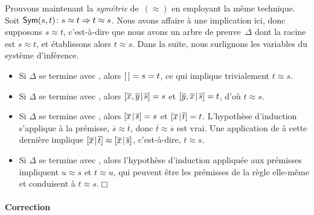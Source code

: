 Prouvons maintenant la \emph{symétrie} de~\((\approx)\) en employant
la même technique. Soit
\(\textsf{Sym}({s,t})\colon s \approx t \Rightarrow t \approx s\). Nous
avons affaire à une implication ici, donc supposons \(s \approx t\),
c'est-à-dire que nous avons un arbre de preuve~\(\Delta\) dont la
racine est \(s \approx t\), et établissons alors \(t \approx s\). Dans
la suite, nous surlignons les variables du système d'inférence.
\begin{itemize}

  \item Si \(\Delta\) se termine avec , alors \([\,] = s =
  t\), ce qui implique trivialement \(t \approx s\).

  \item Si \(\Delta\) se termine avec , alors
  \([{\overline{x},\overline{y}}\!\mid\!{\overline{s}}] = s\) et
  \([{\overline{y},\overline{x}}\!\mid\!{\overline{s}}] = t\), d'où \(t
  \approx s\).

  \item Si \(\Delta\) se termine avec , alors
  \([{\overline{x}}\!\mid\!{\overline{s}}] = s\) et
  \([{\overline{x}}\!\mid\!{\overline{t}}] = t\). L'hypothèse d'induction
  s'applique à la prémisse, \(\overline{s} \approx \overline{t}\),
  donc \(\overline{t} \approx \overline{s}\) est vrai. Une application
  de  à cette dernière implique
  \([{\overline{x}}\!\mid\!{\overline{t}}] \approx
  [{\overline{x}}\!\mid\!{\overline{s}}]\), c'est-à-dire, \(t \approx s\).

  \item Si \(\Delta\) se termine avec , alors l'hypothèse
  d'induction appliquée aux prémisses impliquent \(u \approx s\) et
  \(t \approx u\), qui peuvent être les prémisses de la règle
   elle-même et conduisent à \(t \approx
  s\).\hfill\(\Box\)

\end{itemize}

\paragraph{Correction}

